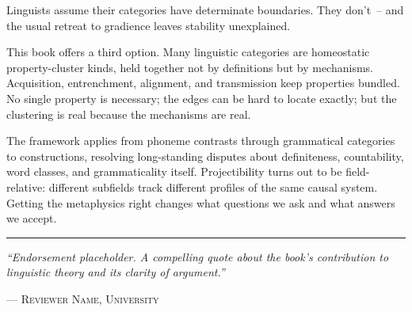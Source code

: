 

\thispagestyle{empty}
\pagecolor{CoverSlate}
\color{CoverWhite}
\setlength{\parindent}{0pt}
\setlength{\parskip}{0pt}

\vspace*{4mm}

\begin{center}
\begin{minipage}{0.84\textwidth}
\color{CoverWhite}

{\fontsize{9.6pt}{13.2pt}\selectfont
Linguists assume their categories have determinate boundaries.
They don't~-- and the usual retreat to gradience leaves stability
unexplained.\par
\vspace{4pt}
This book offers a third option. Many linguistic categories are
homeostatic property-cluster kinds, held together not by
definitions but by mechanisms. Acquisition, entrenchment,
alignment, and transmission keep properties bundled. No single
	property is necessary; the edges can be hard to locate exactly; but the
clustering is real because the mechanisms are real.\par
\vspace{4pt}
The framework applies from phoneme contrasts through grammatical
categories to constructions, resolving long-standing disputes
about definiteness, countability, word classes, and
grammaticality itself. Projectibility turns out to be
field-relative: different subfields track different profiles of
the same causal system. Getting the metaphysics right changes
what questions we ask and what answers we accept.\par}

\vspace{6pt}
{\centering\textcolor{CoverGold}{\rule{0.88\textwidth}{0.35pt}}\par}
\vspace{6pt}

{\centering\fontsize{8.8pt}{12pt}\selectfont
\textit{\enquote{Endorsement placeholder. A compelling quote about the
book's contribution to linguistic theory and its clarity of
argument.}}\par
\vspace{2pt}
{\fontsize{8pt}{10pt}\selectfont
 \scshape
 --- Reviewer Name, University}\par}


\end{minipage}
\end{center}
